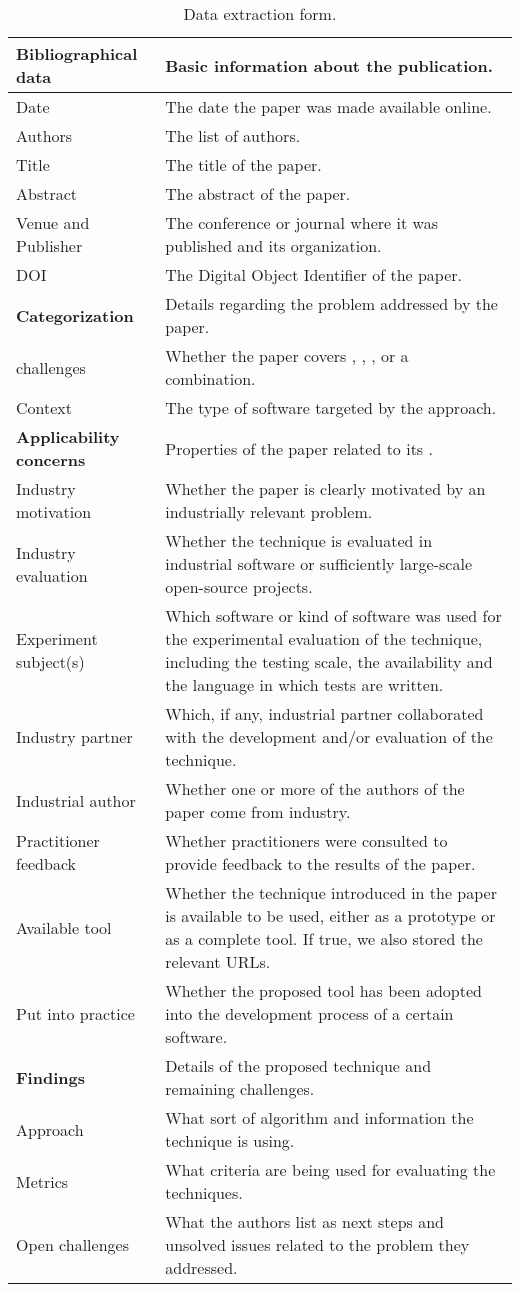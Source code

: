 \newcommand{\rowextraction}[2]{
#1 & %
#2 %
\\ }
\newcommand{\rowextractionheader}[2]{
\textbf{#1} & %
#2 %
\\ }

\begin{table}[]
\centering
\scriptsize
{}
\begin{tabular}{p{}p{}}
\toprule
\rowextractionheader{Bibliographical data}{Basic information about the publication.}
\midrule
\rowextraction{Date}{The date the paper was made available online.}
\rowextraction{Authors}{The list of authors.}
\rowextraction{Title}{The title of the paper.}
\rowextraction{Abstract}{The abstract of the paper.}
\rowextraction{Venue and Publisher}{The conference or journal where it was published and its organization.}
\rowextraction{DOI}{The Digital Object Identifier of the paper.}
\midrule
\rowextractionheader{Categorization}{Details regarding the problem addressed by the paper.}
\midrule
\rowextraction{\rt challenges}{Whether the paper covers \tcp, \tcs, \tsr, \tsa or a combination.}
\rowextraction{Context}{The type of software targeted by the approach.}
\midrule
\rowextractionheader{Applicability \mbox{concerns}}{Properties of the paper related to its \rea.}
\midrule
\rowextraction{Industry motivation}{Whether the paper is clearly motivated by an industrially relevant problem.}
\rowextraction{Industry evaluation}{Whether the technique is evaluated in industrial software or sufficiently large-scale open-source projects.}
\rowextraction{Experiment subject(s)}{Which software or kind of software was used for the experimental evaluation of the technique, including the testing scale, the availability and the language in which tests are written.}
\rowextraction{Industry partner}{Which, if any, industrial partner collaborated with the development and/or evaluation of the technique.}
\rowextraction{Industrial author}{Whether one or more of the authors of the paper come from industry.}
\rowextraction{Practitioner feedback}{Whether practitioners were consulted to provide feedback to the results of the paper.}
\rowextraction{Available tool}{Whether the technique introduced in the paper is available to be used, either as a prototype or as a complete tool. If true, we also stored the relevant URLs.}
\rowextraction{Put into practice}{Whether the proposed tool has been adopted into the development process of a certain software.}
\midrule
\rowextractionheader{Findings}{Details of the proposed technique and remaining challenges.}
\midrule
\rowextraction{Approach}{What sort of algorithm and information the technique is using.}
\rowextraction{Metrics}{What criteria are being used for evaluating the techniques.}
\rowextraction{Open challenges}{What the authors list as next steps and unsolved issues related to the problem they addressed.}
\bottomrule
\end{tabular}
\caption{Data extraction form.}
\label{table:extraction}
\end{table}
